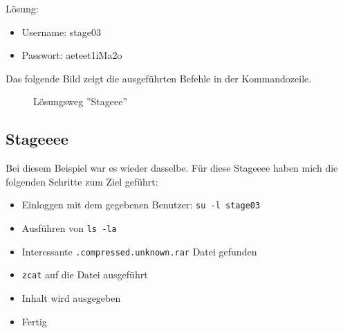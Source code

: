 \documentclass[12pt, a4paper, titlepage, oneside]{scrartcl}
\begin{document}
	Lösung:
	\begin{itemize}
		\item Username: stage03

		\item Passwort: aeteet1iMa2o
	\end{itemize}

	Das folgende Bild zeigt die ausgeführten Befehle in der Kommandozeile.
	\begin{figure}[h!]
		\centering
		\caption{Lösungsweg ''Stageee''}
		\label{fig:stageee_solution}
	\end{figure}

	\newpage

	\subsection{Stageeee}
	Bei diesem Beispiel war es wieder dasselbe. Für diese Stageeee haben mich die
	folgenden Schritte zum Ziel geführt:

	\begin{itemize}
		\item Einloggen mit dem gegebenen Benutzer: \lstinline{su -l stage03}

		\item Ausführen von \lstinline{ls -la}

		\item Interessante \lstinline{.compressed.unknown.rar} Datei gefunden

		\item \lstinline{zcat} auf die Datei ausgeführt

		\item Inhalt wird ausgegeben

		\item Fertig
	\end{itemize}
\end{document}
